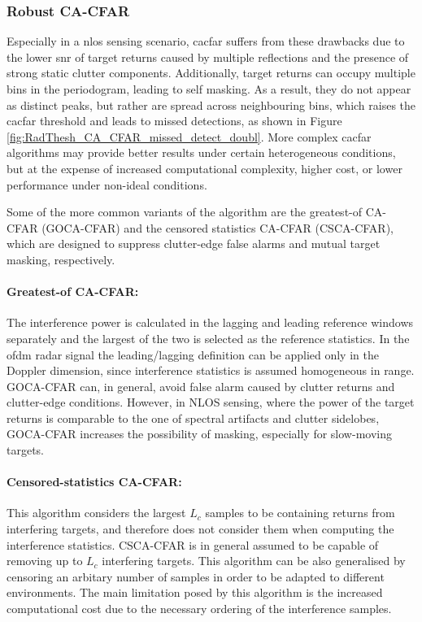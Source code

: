 \subsubsection{Robust CA-CFAR}
Especially in a \gls{nlos} sensing scenario, \gls{cacfar} suffers from these drawbacks due to the lower \gls{snr} of target returns caused by multiple reflections and the presence of strong static clutter components.
Additionally, target returns can occupy multiple bins in the periodogram, leading to self masking. 
As a result, they do not appear as distinct peaks, but rather are spread across neighbouring bins, which raises the \gls{cacfar} threshold and leads to missed detections, as shown in Figure \ref{fig:RadThesh_CA_CFAR_missed_detect_doubl}.
More complex \gls{cacfar} algorithms may provide better results under certain heterogeneous conditions, but at the expense of increased computational complexity, higher cost, or lower performance under non-ideal conditions.

Some of the more common variants of the algorithm are the greatest-of CA-CFAR (GOCA-CFAR) and the censored statistics CA-CFAR (CSCA-CFAR), which are designed to suppress clutter-edge false alarms and mutual target masking, respectively.
\paragraph{Greatest-of CA-CFAR:}
The interference power is calculated in the lagging and leading reference windows separately and the largest of the two is selected as the reference statistics. In the \gls{ofdm} radar signal the leading/lagging definition can be applied only in the Doppler dimension, since interference statistics is assumed homogeneous in range.
GOCA-CFAR can, in general, avoid false alarm caused by clutter returns and clutter-edge conditions. However, in NLOS sensing, where the power of the target returns is comparable to the one of spectral artifacts and clutter sidelobes, GOCA-CFAR increases the possibility of masking, especially for slow-moving targets.
\paragraph{Censored-statistics CA-CFAR:}
This algorithm considers the largest $L_c$ samples to be containing returns from interfering targets, and therefore does not consider them when computing the interference statistics. CSCA-CFAR is in general assumed to be capable of removing up to $L_c$ interfering targets.
This algorithm can be also generalised by censoring an arbitary number of samples in order to be adapted to different environments. 
The main limitation posed by this algorithm is the increased computational cost due to the necessary ordering of the interference samples.


